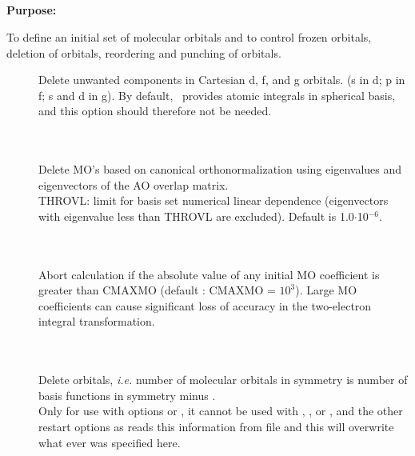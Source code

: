 \pagebreak[3]
\subsection{\label{ref-orbinp}}

{\bf Purpose:}

To define an initial set of molecular orbitals
and to control frozen orbitals, deletion of orbitals,
reordering and punching of orbitals.

\begin{description}
\item[]
  Delete unwanted components in Cartesian d, f, and g orbitals.
  (s in d; p in f; s and d in g). By default, \her\ provides atomic
  integrals in spherical basis, and this option should therefore not
  be needed.

\item[] \ \\
   \\
  Delete MO's based on canonical orthonormalization using eigenvalues
  and eigenvectors of the AO overlap matrix. \\
  THROVL: limit for basis
  set numerical linear dependence (eigenvectors with eigenvalue less
  than THROVL are excluded). Default is 1.0$\cdot$10$^{-6}$.

\item[] \ \\
   \\
  Abort calculation if the absolute value of any initial MO coefficient is
  greater than CMAXMO (default : CMAXMO = $10^3$).  Large MO coefficients
  can cause significant loss of accuracy in the two-electron integral
  transformation.

\item[] \ \\
   \\
  Delete orbitals, {\it i.e.\/} number of molecular orbitals
  in symmetry  is number of basis functions in symmetry  minus
  . \\
  Only for use with  options  or , 
  it cannot be used with , , or ,
  and the other restart options as  reads this information from file
  and this will overwrite what ever was specified here.


\end{description}
